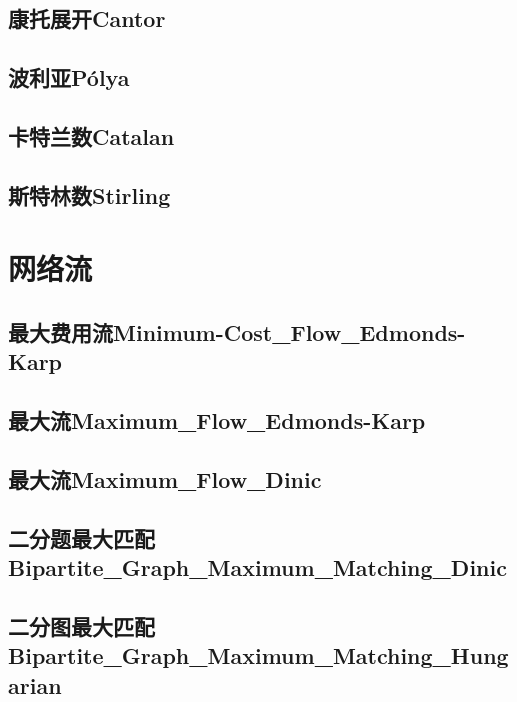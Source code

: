 \documentclass[10pt,a4paper]{article}
\begin{document}
\subsection{康托展开Cantor}

\subsection{波利亚P\'{o}lya}

\subsection{卡特兰数Catalan}

\subsection{斯特林数Stirling}



\newpage
\section{网络流}
\subsection{最大费用流Minimum-Cost\_Flow\_Edmonds-Karp}

\subsection{最大流Maximum\_Flow\_Edmonds-Karp}

\subsection{最大流Maximum\_Flow\_Dinic}

\subsection{二分题最大匹配Bipartite\_Graph\_Maximum\_Matching\_Dinic}

\subsection{二分图最大匹配Bipartite\_Graph\_Maximum\_Matching\_Hungarian}

\end{document}
